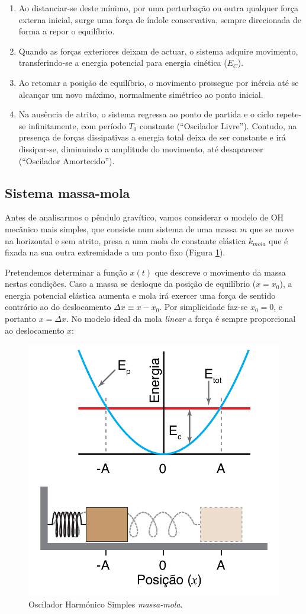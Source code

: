 \documentclass[a4paper,twoside,12pt]{article}      %
\begin{document}
\begin{enumerate}
\item  Ao distanciar-se deste mínimo, por uma perturbação ou outra qualquer força externa inicial, 
surge uma força de índole conservativa, sempre direcionada de forma a repor o equilíbrio.
\item Quando as forças exteriores deixam de actuar, o sistema adquire movimento, 
transferindo-se a energia potencial para energia cinética ($E_C$).
\item Ao retomar a posição de equilíbrio, o movimento prossegue por inércia até se alcançar um 
novo máximo, normalmente simétrico ao ponto inicial.
\item Na ausência de atrito, o sistema regressa  ao ponto de partida e o ciclo repete-se infinitamente, com período $T_0$ constante (``Oscilador Livre''). Contudo, na presença de forças dissipativas a energia total deixa de ser constante e irá dissipar-se, diminuindo a amplitude do movimento, até desaparecer (``Oscilador Amortecido'').
\end{enumerate}


\subsection{\sf Sistema massa-mola}
Antes de analisarmos o pêndulo gravítico, vamos considerar o modelo de OH mecânico mais simples, que consiste num sistema de uma massa $m$ que se 
move na horizontal e sem atrito,  presa a uma mola de constante elástica $k_{mola}$ que é fixada na sua outra extremidade a um ponto fixo (Figura \ref{fig:2}). 

Pretendemos determinar a função $x(t)$ que descreve o movimento da massa nestas condições. Caso a massa se desloque da posição de equilíbrio ($x =x_0$), a energia potencial elástica aumenta e mola irá exercer uma força de sentido contrário ao do deslocamento $\Delta x \equiv x - x_0$. Por simplicidade faz-se $x_0=0$, e portanto $x=\Delta x$.
 No modelo ideal da mola \emph{linear}  a força é sempre proporcional ao deslocamento $x$:

\begin{figure}
	[b] \centering 
	\includegraphics[width=0.4	\textwidth]{harmonic_oscillator} 
	\caption{Oscilador Harmónico Simples \emph{massa-mola}.  \label{fig:2}} 
\end{figure}
\end{document}
